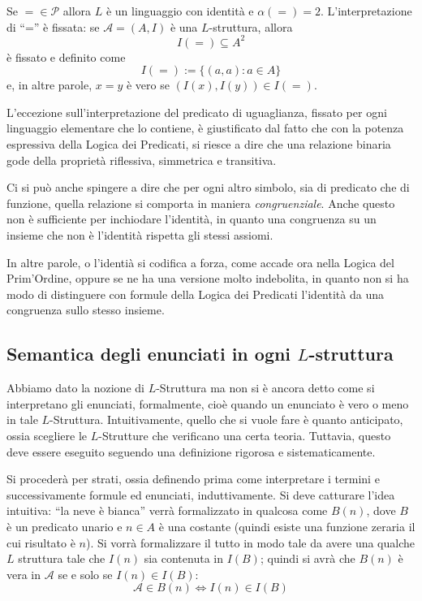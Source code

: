 \begin{oss}
        Se $ = \in \mathcal{P}$ allora $L$ è un linguaggio con identità e 
        $\alpha(=) = 2$. L'interpretazione di ``='' è fissata: 
        se $\mathcal{A}=(A,I)$ è una $L$-struttura, allora 
        $$
        I(=) \subseteq A^2 
        $$
        è fissato e definito come 
        $$
        I(=):= \{(a,a) : a \in A\}
        $$
        e, in altre parole, $x = y$ è vero se $(I(x), I(y)) \in I(=)$.
\end{oss}

L'eccezione sull'interpretazione del predicato di uguaglianza, fissato per 
ogni linguaggio elementare che lo contiene, è giustificato dal fatto che con 
la potenza espressiva della Logica dei Predicati, si riesce a dire che una 
relazione binaria gode della proprietà riflessiva, simmetrica e transitiva.  

Ci si può anche spingere a dire che per ogni altro simbolo, sia di predicato 
che di funzione, quella relazione si comporta in maniera \textit{congruenziale}. 
Anche questo non è sufficiente per inchiodare l'identità, in quanto una congruenza 
su un insieme che non è l'identità rispetta gli stessi assiomi. 

In altre parole, o l'identià si codifica a forza, come accade ora nella Logica 
del Prim'Ordine, oppure se ne ha una versione molto indebolita, in quanto non si 
ha modo di distinguere con formule della Logica dei Predicati l'identità 
da una congruenza sullo stesso insieme.  

\subsection{Semantica degli enunciati in ogni $L$-struttura}
Abbiamo dato la nozione di $L$-Struttura ma non si è ancora detto 
come si interpretano gli enunciati, formalmente, cioè quando un 
enunciato è vero o meno in tale $L$-Struttura. Intuitivamente, quello che 
si vuole fare è quanto anticipato, ossia scegliere le $L$-Strutture che 
verificano una certa teoria. Tuttavia, questo deve essere eseguito 
seguendo una definizione rigorosa e sistematicamente.

Si procederà per strati, ossia definendo prima come interpretare 
i termini e successivamente formule ed enunciati, induttivamente. 
Si deve catturare l'idea intuitiva: ``la neve è bianca'' verrà 
formalizzato in qualcosa come $B(n)$, dove $B$ è un predicato 
unario e $n \in A$ è una costante (quindi esiste una funzione zeraria 
il cui risultato è $n$). Si vorrà formalizzare il tutto in modo tale da avere una 
qualche $L$ struttura tale che $I(n)$ sia contenuta in $I(B)$; quindi si avrà che 
$B(n)$ è vera in $\mathcal{A}$ se e solo se $I(n) \in I(B)$: 
$$
\mathcal{A} \in B(n) \iff I(n) \in I(B)
$$

